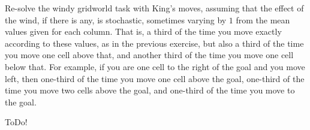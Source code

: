
\begin{exercise}

Re-solve the windy gridworld task with King's moves, assuming that the effect of the wind, if there is any, is stochastic, sometimes varying by $1$ from the mean values given for each column.
That is, a third of the time you move exactly according to these values, as in the previous exercise, but also a third of the time you move one cell above that, and another third of the time you move one cell below that.
For example, if you are one cell to the right of the goal and you move left, then one-third of the time you move one cell above the goal, one-third of the time you move two cells above the goal, and one-third of the time you move to the goal.

\end{exercise}


\begin{solution}

ToDo!

\end{solution}

